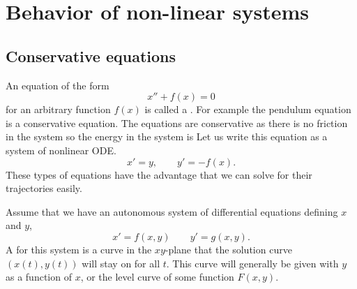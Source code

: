 \section{Behavior of non-linear systems}
\label{nlinHamiltonian:section}



\subsection{Conservative equations}

An equation of the form
\begin{equation*}
x'' + f(x) = 0
\end{equation*}
for an arbitrary function $f(x)$ is called a
\emph{}.  For example the pendulum equation
is a conservative equation.  The equations are conservative as there is no
friction in the system so the energy in the system is 
Let us write this equation as a
system of nonlinear ODE.
\begin{equation*}
x' = y, \qquad y' = -f(x) .
\end{equation*}
These types of equations have the
advantage that we can solve for their trajectories easily.

\begin{definition}
Assume that we have an autonomous system of differential equations defining $x$ and $y$, 
\begin{equation*}
x' = f(x,y) \qquad y' = g(x,y).
\end{equation*}
A \emph{} for this system is a curve in the $xy$-plane that the solution curve $(x(t), y(t))$ will stay on for all $t$. This curve will generally be given with $y$ as a function of $x$, or the level curve of some function $F(x,y)$. 
\end{definition}

